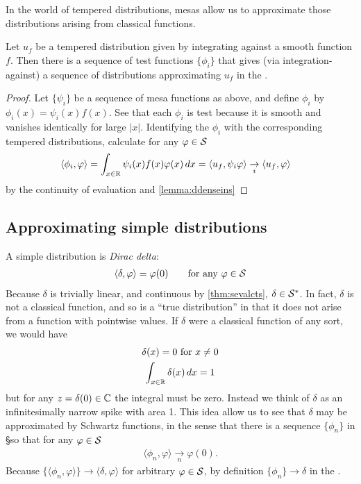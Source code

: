     In the world of tempered distributions, mesas allow us to approximate those distributions arising from classical functions.
    \begin{lemma}
      \label{lemma:ddenseinssfromsmooth}
      Let $u_f$ be a tempered distribution given by integrating against a smooth function $f$.
      Then there is a sequence of test functions $\{\phi_i\}$ that gives (via integration-against) a sequence of distributions approximating $u_f$ in the \ws.
    \end{lemma}
    \begin{proof}
      Let $\{\psi_i\}$ be a sequence of mesa functions as above, and define $\phi_i$ by $\phi_i(x) = \psi_i(x)f(x)$.
      See that each $\phi_i$ is test because it is smooth and vanishes identically for large $|x|$.
      Identifying the $\phi_i$ with the corresponding tempered distributions, calculate for any $\varphi\in\S$
      \begin{align*}
        \langle \phi_i, \varphi\rangle
        &= \int_{x\in\R} \psi_i(x)f(x)\varphi(x)\,dx
        = \langle u_f, \psi_i\varphi\rangle
        \underset{i}{\rightarrow} \langle u_f, \varphi\rangle
      \end{align*}
      by the continuity of evaluation and \cref{lemma:ddenseins}
    \end{proof}

  \subsection{Approximating simple distributions}
    A simple distribution is \emph{Dirac delta}:
    \begin{gather*}
      \langle\delta,\varphi\rangle = \varphi(0)
      \qquad\text{for any }\varphi\in\S
    \end{gather*}
    Because $\delta$ is trivially linear, and continuous by \cref{thm:sevalcts}, $\delta\in\SS$.
    In fact, $\delta$ is not a classical function, and so is a ``true distribution'' in that it does not arise from a function with pointwise values.
    If $\delta$ were a classical function of any sort, we would have
    \begin{gather*}
      \delta(x)=0\text{ for }x\ne0\\
      \int_{x\in\R} \delta(x)\,dx = 1
    \end{gather*}
    but for any $z=\delta(0)\in\C$ the integral must be zero.
    Instead we think of $\delta$ as an infinitesimally narrow spike with area 1.
    This idea allow us to see that $\delta$ may be approximated by Schwartz functions, in the sense that there is a sequence $\{\phi_n\}$ in \S so that for any $\varphi\in\S$
    \begin{align*}
      \langle \phi_n, \varphi\rangle \underset{n}{\longrightarrow} \varphi(0)\text{.}
    \end{align*}
    Because $\{\langle\phi_n,\varphi\rangle\}\rightarrow\langle\delta,\varphi\rangle$ for arbitrary $\varphi\in\S$, by definition $\{\phi_n\}\rightarrow\delta$ in the \ws.

